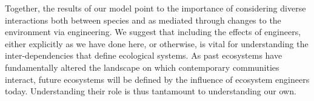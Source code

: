 \documentclass[9pt,twocolumn,twoside]{pnas-new}
\begin{document}



Together, the results of our model point to the importance of considering diverse interactions both between species and as mediated through changes to the environment via engineering.
We suggest that including the effects of engineers, either explicitly as we have done here, or otherwise, is vital for understanding the inter-dependencies that define ecological systems.
As past ecosystems have fundamentally altered the landscape on which contemporary communities interact, future ecosystems will be defined by the influence of ecosystem engineers today.
Understanding their role is thus tantamount to understanding our own.\\


\end{document}
